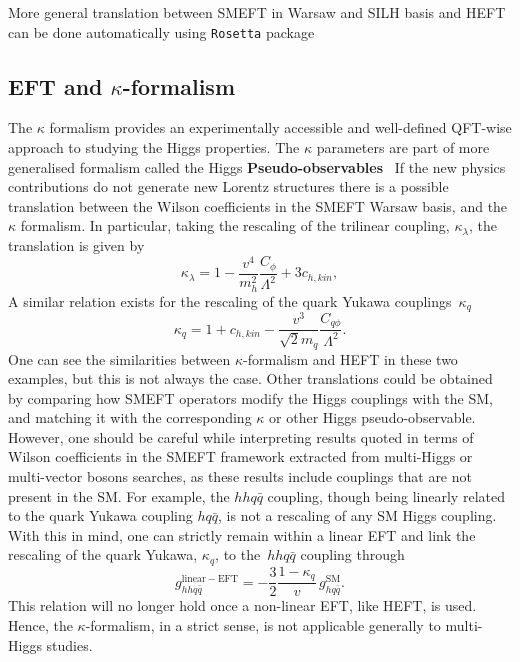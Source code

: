 More general translation between SMEFT in Warsaw and SILH basis and HEFT can be done automatically using \texttt{Rosetta} package~\cite{Falkowski:2015wza}
\subsection{EFT and $\kappa$-formalism \label{eftkappa}}
The $\kappa$ formalism provides an experimentally accessible and well-defined QFT-wise approach to studying the Higgs properties. The $\kappa$ parameters are part of more generalised formalism called the Higgs \textbf{Pseudo-observables}~\cite{Gonzalez-Alonso:2014eva} 
 If the new physics contributions do not generate new Lorentz structures there is a possible translation between the Wilson coefficients in the SMEFT Warsaw basis, and the $\kappa$ formalism. In particular, taking the rescaling of the trilinear coupling, $\kappa_\lambda$, the translation is given by
 \begin{equation}
	     \kappa_\lambda = 1-\frac{v^4}{m_h^2} \frac{C_\phi}{\Lambda^2}+3 c_{h,kin},
	 \end{equation}
 A similar relation exists for the rescaling of the quark Yukawa couplings~$\kappa_q$
 \begin{equation}
	   \kappa_q = 1+c_{h,kin}- \frac{v^3}{\sqrt{2}m_q}\frac{C_{q\phi}}{\Lambda^2}.
	 \end{equation}
One can see the similarities between $\kappa$-formalism and HEFT in these two examples, but this is not always the case.  Other translations could be obtained by comparing how SMEFT operators modify the Higgs couplings with the SM, and matching it with the corresponding $\kappa$ or other Higgs pseudo-observable.\\ 
 However, one should be careful while interpreting results quoted in terms of Wilson coefficients in the SMEFT framework extracted from multi-Higgs or multi-vector bosons searches, as these results include couplings that are not present in the SM. For example, the $hh q\bar{q}$ coupling, though being linearly related to the quark Yukawa coupling $h q\bar{q}$, is not a rescaling of any SM Higgs coupling. With this in mind, one can strictly remain within a linear EFT and link the rescaling of the quark Yukawa, $\kappa_q$, to the~$hh q\bar{q}$ coupling through
 \begin{equation}
	   g_{hhq\bar{q}}^{\mathrm{linear-EFT}} = -\frac{3}{2}\frac{1-\kappa_q}{v} \, g_{h q\bar{q}}^{\mathrm{SM}}.
	 \end{equation}
 This relation will no longer hold once a non-linear EFT, like HEFT, is used. Hence, the $\kappa$-formalism, in a strict sense, is not applicable generally to multi-Higgs studies.
